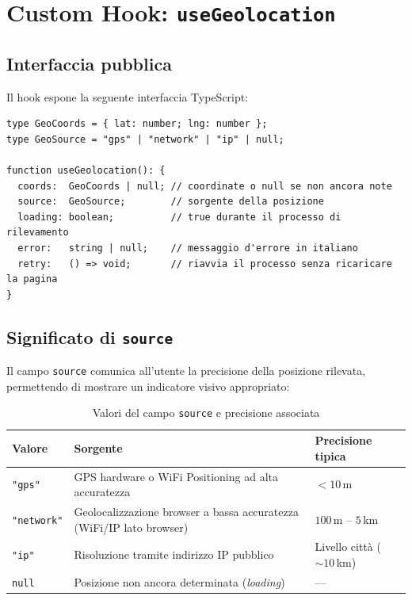 \documentclass[12pt, a4paper]{article}
\begin{document}
\section{Custom Hook: \texttt{useGeolocation}}

\subsection{Interfaccia pubblica}

Il hook espone la seguente interfaccia TypeScript:

\begin{lstlisting}[caption={Tipo di ritorno del hook \texttt{useGeolocation}}]
type GeoCoords = { lat: number; lng: number };
type GeoSource = "gps" | "network" | "ip" | null;

function useGeolocation(): {
  coords:  GeoCoords | null; // coordinate o null se non ancora note
  source:  GeoSource;        // sorgente della posizione
  loading: boolean;          // true durante il processo di rilevamento
  error:   string | null;    // messaggio d'errore in italiano
  retry:   () => void;       // riavvia il processo senza ricaricare la pagina
}
\end{lstlisting}

\subsection{Significato di \texttt{source}}

Il campo \texttt{source} comunica all'utente la precisione della posizione
rilevata, permettendo di mostrare un indicatore visivo appropriato:

\begin{table}[h!]
  \centering
  \caption{Valori del campo \texttt{source} e precisione associata}
  \begin{tabularx}{\linewidth}{C{2cm} L{5cm} L{5.5cm}}
    \toprule
    \textbf{Valore} & \textbf{Sorgente} & \textbf{Precisione tipica} \\
    \midrule
    \texttt{"gps"}     & GPS hardware o WiFi Positioning ad alta accuratezza & $< 10$\,m \\
    \addlinespace
    \texttt{"network"} & Geolocalizzazione browser a bassa accuratezza (WiFi/IP lato browser) & $100$\,m -- $5$\,km \\
    \addlinespace
    \texttt{"ip"}      & Risoluzione tramite indirizzo IP pubblico & Livello città ($\sim 10$\,km) \\
    \addlinespace
    \texttt{null}      & Posizione non ancora determinata (\textit{loading}) & — \\
    \bottomrule
  \end{tabularx}
\end{table}
\end{document}
